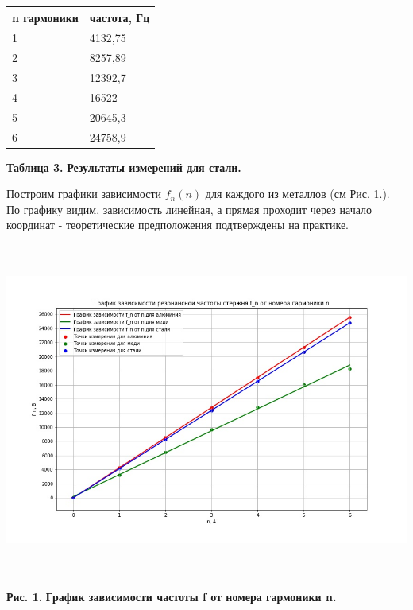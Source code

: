\begin{table}[h!]
\centering
\begin{tabular}{|l|l|}
\hline
n гармоники & частота, Гц \\ \hline
1           & 4132,75     \\ \hline
2           & 8257,89     \\ \hline
3           & 12392,7     \\ \hline
4           & 16522       \\ \hline
5           & 20645,3     \\ \hline
6           & 24758,9     \\ \hline
\end{tabular}
\begin{flushright}
{\scriptsize \textbf{Таблица 3.} \textbf {Результаты измерений для стали.}}
\end{flushright}
\end{table}

    Построим графики зависимости $f_n(n)$ для каждого из металлов (см Рис. 1.). По графику видим, зависимость линейная, а прямая проходит через начало координат - теоретические предположения подтверждены на практике.
    
\begin{center}
\includegraphics[width=15cm, height=11cm]{graph.jpg}
\end{center}

\begin{flushright}
{\scriptsize \textbf{Рис. 1.} \textbf {График зависимости частоты f от номера гармоники n.}}
\end{flushright}


